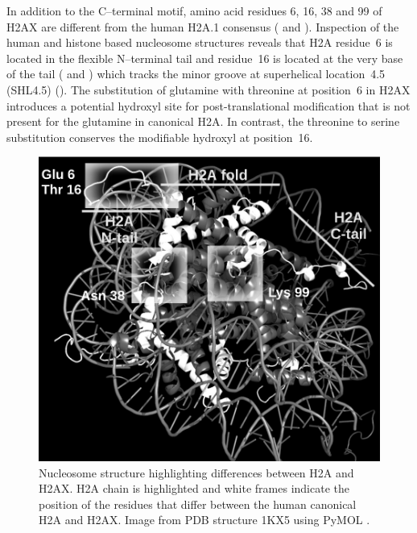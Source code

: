 In addition to the C--terminal motif, amino acid residues 6, 16, 38
and 99 of H2AX are different from the human H2A.1 consensus
( and
). Inspection of the human and
 histone based nucleosome structures reveals that
H2A residue~6 is located in the flexible N--terminal tail and
residue~16 is located at the very base of the tail
( and
) which tracks the minor groove at
superhelical location~4.5 (SHL4.5)
(). The substitution of glutamine with
threonine at position~6 in H2AX introduces a potential hydroxyl site
for post-translational modification that is not present for the
glutamine in canonical H2A. In contrast, the threonine to serine
substitution conserves the modifiable hydroxyl at position~16.

\begin{figure}
\includegraphics{h2ax-review/figs/Fig4}
\caption[Nucleosome structure highlighting differences between H2A and H2AX]%
        {Nucleosome structure highlighting differences between H2A and
          H2AX\@. H2A chain is highlighted and white frames indicate
          the position of the residues that differ between the human
          canonical H2A and H2AX\@. Image from PDB structure 1KX5
          using PyMOL \citep{DeL02}.}
\label{fig:h2ax-review:H2AInNucleosome}
\end{figure}

